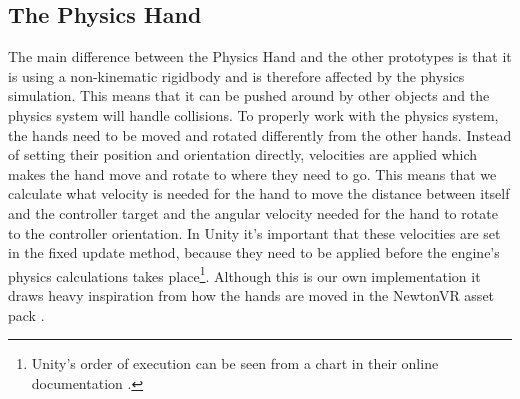 \subsection{The Physics Hand}
\label{subsec:physicsHand}
The main difference between the Physics Hand and the other prototypes is that it is using a non-kinematic rigidbody and is therefore affected by the physics simulation. This means that it can be pushed around by other objects and the physics system will handle collisions. To properly work with the physics system, the hands need to be moved and rotated differently from the other hands. Instead of setting their position and orientation directly, velocities are applied which makes the hand move and rotate to where they need to go. This means that we calculate what velocity is needed for the hand to move the distance between itself and the controller target and the angular velocity needed for the hand to rotate to the controller orientation. In Unity it's important that these velocities are set in the fixed update method, because they need to be applied before the engine's physics calculations takes place\footnote{Unity's order of execution can be seen from a chart in their online documentation \parencite{UnityExecutionOrder2017}.}. Although this is our own implementation it draws heavy inspiration from how the hands are moved in the NewtonVR asset pack \parencite{TomorrowTodayLabs2016}.

